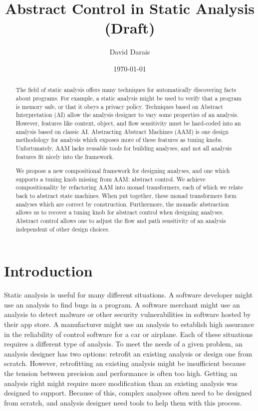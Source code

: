 \documentclass{article}
\title{Abstract Control in Static Analysis (Draft)}
\author{David Darais}
\date{\today}
\begin{document}
\maketitle


\begin{abstract}

The field of static analysis offers many techniques for automatically discovering facts about programs.
For example, a static analysis might be used to verify that a program is memory safe, or that it obeys a privacy policy.
Techniques based on Abstract Interpretation (AI) allow the analysis designer to vary some properties of an analysis.
However, features like context, object, and flow sensitivity must be hard-coded into an analysis based on classic AI.
Abstracting Abstract Machines (AAM) is one design methodology for analysis which exposes more of these features as tuning knobs.
Unfortunately, AAM lacks reusable tools for building analyses, and not all analysis features fit nicely into the framework.

We propose a new compositional framework for designing analyses, and one which supports a tuning knob missing from AAM: abstract control.
We achieve compositionality by refactoring AAM into monad transformers, each of which we relate back to abstract state machines.
When put together, these monad transformers form analyses which are correct by construction.
Furthermore, the monadic abstraction allows us to recover a tuning knob for abstract control when designing analyses.
Abstract control allows one to adjust the flow and path sensitivity of an analysis independent of other design choices.

\end{abstract}

\tableofcontents

\section{Introduction}
\label{section:Introduction}

Static analysis is useful for many different situations.
A software developer might use an analysis to find bugs in a program.
A software merchant might use an analysis to detect malware or other security vulnerabilities in software hosted by their app store.
A manufacturer might use an analysis to establish high assurance in the reliability of control software for a car or airplane.
Each of these situations requires a different type of analysis.
To meet the needs of a given problem, an analysis designer has two options: retrofit an existing analysis or design one from scratch.
However, retrofitting an existing analysis might be insufficient because the tension between precision and performance is often too high.
Getting an analysis right might require more modification than an existing analysis was designed to support.
Because of this, complex analyses often need to be designed from scratch, and analysis designer need tools to help them with this process.
\end{document}
